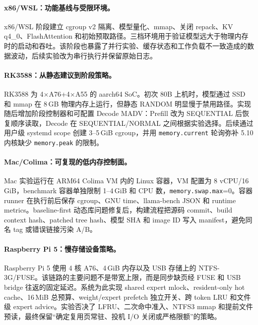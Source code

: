 \paragraph{x86/WSL：功能基线与受限环境。}

x86/WSL 阶段建立 cgroup v2 隔离、模型量化、mmap、关闭 repack、KV q4\_0、FlashAttention 和初始预取路径。三档环境用于验证模型远大于物理内存时的启动和吞吐。该阶段也暴露了并行实验、缓存状态和工作负载不一致造成的数据波动，后续实验改为串行执行并保留原始日志。

\paragraph{RK3588：从静态建议到阶段策略。}

RK3588 为 4$\times$A76+4$\times$A55 的 aarch64 SoC。初次 80B 上机时，模型通过 SSD 和 mmap 在 8\,GB 物理内存上运行，但静态 RANDOM 明显慢于禁用路径。实现随后增加阶段控制器和可配置 Decode MADV：Prefill 改为 SEQUENTIAL 后恢复顺序读取，Decode 在 SEQUENTIAL/NORMAL 之间根据实验选择。后续通过用户级 systemd scope 创建 3--5\,GiB cgroup，并用 \texttt{memory.current} 轮询弥补 5.10 内核缺少 \texttt{memory.peak} 的限制。

\paragraph{Mac/Colima：可复现的低内存控制面。}

Mac 实验运行在 ARM64 Colima VM 内的 Linux 容器，VM 配置为 8 vCPU/16\,GiB，benchmark 容器单独限制 1--4\,GiB 和 CPU 数，\texttt{memory.swap.max}=0。容器 runner 在执行前后保存 cgroup、GNU time、llama-bench JSON 和 runtime metrics。baseline-first 动态库问题修复后，构建流程把源码 commit、build context hash、patched tree hash、模型 SHA 和 image ID 写入 manifest，避免同名 tag 或错误链接污染 A/B。

\paragraph{Raspberry Pi 5：慢存储设备策略。}

Raspberry Pi 5 使用 4 核 A76、4\,GiB 内存以及 USB 存储上的 NTFS-3G/FUSE。该链路的主要问题不是带宽上限，而是同步缺页经 FUSE 和 USB bridge 往返的固定延迟。系统为此实现 shared expert mlock、resident-only hot cache、16\,MiB 总预算、weight/expert prefetch 独立开关、跨 token LRU 和文件级 expert advice。实验否决了 LFRU、二次命中准入、NTFS3 mmap 和提前文件预读，最终保留“确定复用页常驻、投机 I/O 关闭或严格限额”的策略。

